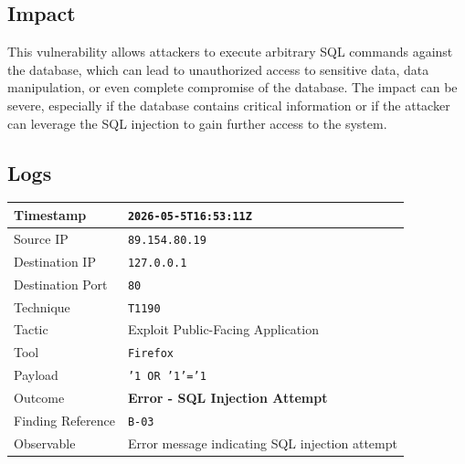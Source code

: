 \documentclass[11pt,a4paper]{report}
\begin{document}
    \subsection*{Impact}
    This vulnerability allows attackers to execute arbitrary SQL commands against the database, which can lead to unauthorized access to sensitive data, data manipulation, or even complete compromise of the database. The impact can be severe, especially if the database contains critical information or if the attacker can leverage the SQL injection to gain further access to the system.

    \subsection*{Logs}
    
     \begin{table}[h!]
    \centering
    \renewcommand{\arraystretch}{1.3}
    \begin{tabular}{|p{4cm}|p{9cm}|}
    \hline
    Timestamp & \texttt{2026-05-5T16:53:11Z} \\
    \hline
    Source IP & \texttt{89.154.80.19} \\
    \hline
    Destination IP & \texttt{127.0.0.1} \\
    \hline
    Destination Port & \texttt{80} \\
    \hline
    Technique & \texttt{T1190} \\
    \hline
    Tactic & Exploit Public-Facing Application \\
    \hline
    Tool & \texttt{Firefox} \\
    \hline
    Payload & \texttt{'1 OR '1'='1} \\
    \hline
    Outcome & \textbf{Error - SQL Injection Attempt} \\
    \hline
    Finding Reference & \texttt{B-03} \\
    \hline
    Observable & Error message indicating SQL injection attempt \\
    \hline
    \end{tabular}
    \end{table}
\end{document}

